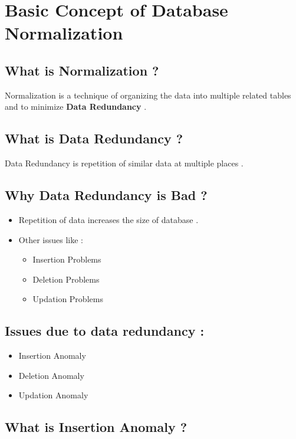 \documentclass[10pt]{article}
\begin{document}
\section{Basic Concept of Database Normalization}


\subsection{What is Normalization ?}

Normalization is a technique of organizing the data into multiple related tables and to minimize \textbf{Data Redundancy} .


\subsection{What is Data Redundancy ?}

Data Redundancy is repetition of similar data at multiple  places .

\subsection{Why Data Redundancy is Bad ?}

\begin{itemize}
	\item Repetition of data increases the size of database .
	\item Other issues like :
	\begin{itemize}
		\item Insertion Problems
		\item Deletion Problems
		\item Updation Problems
	\end{itemize}
\end{itemize}




\subsection{Issues due to data redundancy :}

\begin{itemize}
	\item Insertion Anomaly
	\item Deletion Anomaly
	\item Updation Anomaly
\end{itemize}


\subsection{What is Insertion Anomaly ?}
\end{document}
